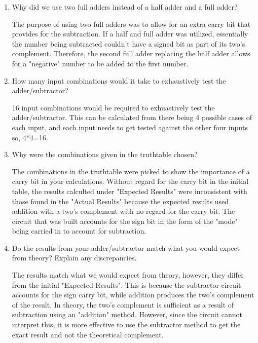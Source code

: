 \documentclass[11pt]{article}
\begin{document}
\begin{enumerate}
	
	
	\item Why did we use two full adders instead of a half adder and a full adder?
	
	The purpose of using two full adders was to allow for an extra carry bit that provides for the subtraction. If a half and full adder was utilized, essentially the number being subtracted couldn't have a signed bit as part of its two's complement. Therefore, the second full adder replacing the half adder allows for a "negative" number to be added to the first number. 
	
	\item How many input combinations would it take to exhaustively test the adder/subtractor?
	
	16 input combinations would be required to exhuastively test the adder/subtractor. This can be calculated from there being 4 possible cases of each input, and each input needs to get tested against the other four inputs so, 4*4=16.
	
	\item Why  were  the  combinations  given  in  the  truthtable chosen? 
	
	The combinations in the truthtable were picked to show the importance of a carry bit in your calculations. Without regard for the carry bit in the initial table, the results calculted under "Expected Results" were inconsistent with those found in the "Actual Results" because the expected results used addition with a two's complement with no regard for the carry bit. The circuit that was built accounts for the sign bit in the form of the "mode" being carried in to account for subtraction.
	
	\item Do the results from your adder/subtractor match what  you  would  expect  from  theory?   Explain any discrepancies.
	
	The results match what we would expect from theory, however, they differ from the initial "Expected Results". This is because the subtractor circuit accounts for the sign carry bit, while addition produces the two's complement of the result. In theory, the two's complement is sufficient as a result of subtraction using an "addition" method. However, since the circuit cannot interpret this, it is more effective to use the subtractor method to get the exact result and not the theoretical complement.
	
\end{enumerate}
\end{document}
